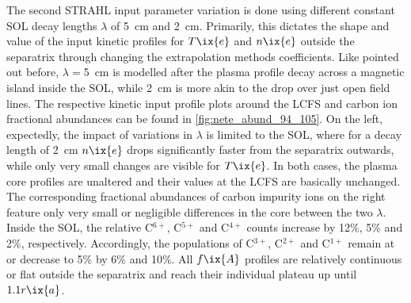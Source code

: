             The second STRAHL input parameter variation is done using different constant SOL decay lengths $\lambda$ of \SI{5}{\centi\meter} and \SI{2}{\centi\meter}. Primarily, this dictates the shape and value of the input kinetic profiles for $T\ix{e}$ and $n\ix{e}$ outside the separatrix through changing the extrapolation methods coefficients. Like pointed out before, $\lambda=$\SI{5}{\centi\meter} is modelled after the plasma profile decay across a magnetic island inside the SOL, while \SI{2}{\centi\meter} is more akin to the drop over just open field lines. The respective kinetic input profile plots around the LCFS and carbon ion fractional abundances can be found in \cref{fig:nete_abund_94_105}. On the left, expectedly, the impact of variations in $\lambda$ is limited to the SOL, where for a decay length of \SI{2}{\centi\meter} $n\ix{e}$ drops significantly faster from the separatrix outwards, while only very small changes are visible for $T\ix{e}$. In both cases, the plasma core profiles are unaltered and their values at the LCFS are basically unchanged. The corresponding fractional abundances of carbon impurity ions on the right feature only very small or negligible differences in the core between the two $\lambda$. Inside the SOL, the relative C$^{6+}$, C$^{5+}$ and C$^{4+}$ counts increase by 12\%, 5\% and 2\%, respectively. Accordingly, the populations of C$^{3+}$, C$^{2+}$ and C$^{1+}$ remain at or decrease to 5\% by 6\% and 10\%. All $f\ix{A}$ profiles are relatively continuous or flat outside the separatrix and reach their individual plateau up until $1.1r\ix{a}$.\\%
%
            \begin{figure}[t]%
                \centering%
                \begin{minipage}[b]{0.48\textwidth}%
                    \centering%
                \end{minipage}%
                \hfill%
                \begin{minipage}[b]{0.48\textwidth}%
                    \centering%
                \end{minipage}%
                \label{fig:rad_ratios_total_94_105}%
            \end{figure}%
